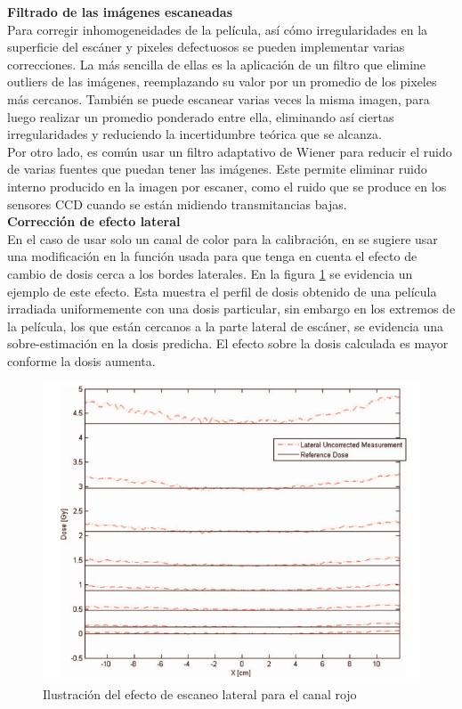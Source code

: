 \textbf{Filtrado de las imágenes escaneadas\cite{Devic2005}\cite{Li2017}}\\

Para corregir inhomogeneidades de la película, así cómo irregularidades en la superficie del escáner y pixeles defectuosos se pueden implementar varias correcciones. La más sencilla de ellas es la aplicación de un filtro que elimine outliers de las imágenes, reemplazando su valor por un promedio de los pixeles más cercanos. También se puede escanear varias veces la misma imagen, para luego realizar un promedio ponderado entre ella, eliminando así ciertas irregularidades y reduciendo la incertidumbre teórica que se alcanza.\\

Por otro lado, es común usar un filtro adaptativo de Wiener para reducir el ruido de varias fuentes que puedan tener las imágenes. Este permite eliminar ruido interno producido en la imagen por escaner, como el ruido que se produce en los sensores CCD cuando se están midiendo transmitancias bajas.\\

\textbf{Corrección de efecto lateral} \\

En el caso de usar solo un canal de color para la calibración, en \cite{Crijns2013} se sugiere usar una modificación en la función usada para que tenga en cuenta el efecto de cambio de dosis cerca a los bordes laterales. En la figura \ref{fig:efectoLateral} se evidencia  un ejemplo de este efecto. Esta muestra el perfil de dosis obtenido de una película irradiada uniformemente con una dosis particular, sin embargo en los extremos de la película, los que están cercanos a la parte lateral de escáner, se evidencia una sobre-estimación en la dosis predicha. El efecto sobre la dosis calculada es mayor conforme la dosis aumenta.\\

\begin{figure}[H]
	\centering
	\includegraphics[width=0.9\linewidth]{images/efectoLateral.png}
	\caption{Ilustración del efecto de escaneo lateral para el canal rojo \cite{Crijns2013}}
	\label{fig:efectoLateral}
\end{figure}

